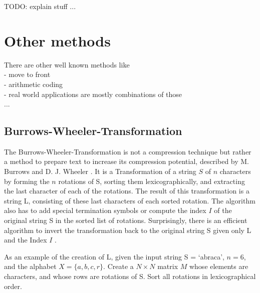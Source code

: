 \par{
TODO: explain stuff
}
...

\section{Other methods}
\label{ch:Principles of compression:sec:Other}
\par{
There are other well known methods like \\
- move to front\\
- arithmetic coding\\
- real world applications are mostly combinations of those\\
}
...
\subsection{Burrows-Wheeler-Transformation}
\par{
\label{ch:PrPrinciples of compression:sec:Other:subSec:bwt}
The Burrows-Wheeler-Transformation is not a compression technique but rather a method to prepare text to increase its compression potential, described by M. Burrows and D. J. Wheeler \cite{Burrows94}. It is a Transformation of a string $S$ of $n$ characters by forming the $n$
rotations of S, sorting them lexicographically, and extracting the last
character of each of the rotations. The result of this transformation is a string L, consisting of these last characters of each sorted rotation. The algorithm also has to add special termination symbols or compute the index $I$ of the original string S in the sorted list of
rotations. Surprisingly, there is an efficient algorithm to invert the transformation back to the original string S given only L and the Index $I$ \cite{Burrows-linear-time}.
}

\par {
As an example of the creation of L, given the input string S = ‘abraca’, $n = 6$, and the alphabet
$X = \{a,b,c,r\}$. Create a $N \times N$ matrix $M$ whose elements are characters, and
whose rows are rotations of S. Sort all rotations in lexicographical order.
}

